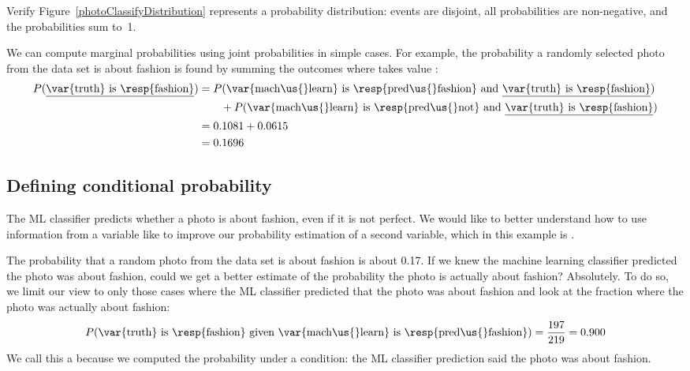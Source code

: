 \D{\newpage}

\begin{exercisewrap}
\begin{nexercise}
Verify Figure~\ref{photoClassifyDistribution} represents
a probability distribution: events are disjoint,
all probabilities are non-negative, and the probabilities
sum to~1.\footnotemark
\end{nexercise}
\end{exercisewrap}

We can compute marginal probabilities using joint probabilities
in simple cases.
For example, the probability a randomly selected photo from the
data set is about fashion is found by summing the outcomes where
 takes value :%
\newcommand{\ultruthfashion}[0]
    {\underline{\var{truth} is \resp{fashion}}}%
\begin{align*}
P(\text{\ultruthfashion{}})
  &= P(\text{\var{mach\us{}learn} is \resp{pred\us{}fashion}
        and \ultruthfashion{}}) \\
    & \qquad + P(\text{\var{mach\us{}learn} is \resp{pred\us{}not}
        and \ultruthfashion{}}) \\
  &= 0.1081 + 0.0615 \\
  &= 0.1696
\end{align*}


\subsection{Defining conditional probability}


The ML classifier predicts whether a photo is about fashion,
even if it is not perfect.
We would like to better understand how to use information
from a variable like  to improve our
probability estimation of a second variable, which in this
example is .

The probability that a random photo from the data set is about
fashion is about 0.17.
If we knew the machine learning classifier predicted the
photo was about fashion, could we get a better estimate of the
probability the photo is actually about fashion?
Absolutely.
To do so, we limit our view to only those \fashYA{} cases
where the ML classifier predicted that the photo was about
fashion and look at the fraction where the photo was actually
about fashion:
\begin{align*}
P(\text{\var{truth} is \resp{fashion} given
    \var{mach\us{}learn} is \resp{pred\us{}fashion}})
  = \frac{\fashYY{}}{\fashYA{}}
  = 0.900
\end{align*}
We call this a  because
we computed the probability under a condition:
the ML classifier prediction said the photo was about fashion.

